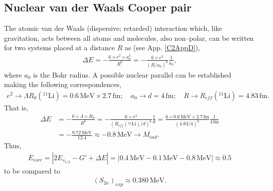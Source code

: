 \begin{subappendices}
 \section{Nuclear van der Waals Cooper pair}\label{C2SG2}
 The atomic van der Waals (dispersive; retarded) interaction which, like gravitation,  acts between all atoms and molecules, also non--polar, can be written for two systems placed at a distance $R$ as (see App. \ref{C2AppD}), 
 \begin{align}\label{eq1C2AppG}
 \Delta E=-\frac{6\times e^2 \times a_0^5}{R^6}=-\frac{6\times e^2}{(R/a_0)^6}\frac{1}{a_0},
 \end{align}
 where $a_0$ is the Bohr radius. A possible nuclear parallel can be established making the following correspondences,
 \begin{align*}
e^2\rightarrow \Lambda R_0 (^{11}\text{Li})=0.6\, \text{MeV}\times 2.7 \,\text{fm};\quad a_0\rightarrow d=4\,\text{fm};\quad R\rightarrow R_{eff} (^{11}\text{Li})=4.83\,\text{fm}.
 \end{align*} 
 That is,
  \begin{align*}
  \Delta E&=-\frac{6\times \Lambda\times R_0}{R^6}=-\frac{6\times e^2}{(R_{eff} (^{11}\text{Li})/d)^6}\frac{1}{d}=\frac{6\times 0.6\,\text{MeV}\times 2.7 \,\text{fm}}{(4.83/4)^6}\frac{1}{4\,\text{fm}}\\
&  =-\frac{9.72 
\,\text{MeV}}{12.4}\approx -0.8\,\text{MeV}\rightarrow M_{ind}.
  \end{align*}
  Thus,
 \begin{align*}
E_{corr}=|2E_{s_{1/2}}-G'+\Delta E|=|0.4\,\text{MeV}-0.1\,\text{MeV}-0.8\,\text{MeV}|\approx 0.5
 \end{align*} 
to be compared to
 \begin{align*}
(S_{2n})_{exp}\approx 0.380 \,\text{MeV}.
 \end{align*} 



\end{subappendices}
